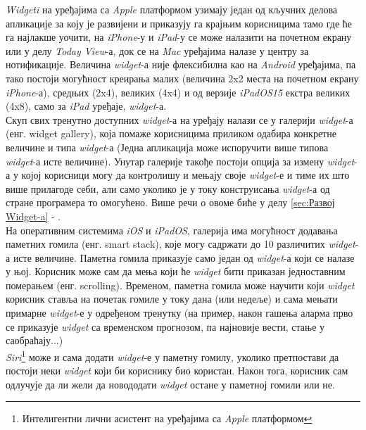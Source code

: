 \documentclass[12pt,oneside]{memoir}
\begin{document}
\indent \textit{Widgeti} на уређајима са \textit{Apple} платформом узимају један од кључних делова апликације за коју је развијени и приказују га крајњим корисницима тамо где ће га најлакше уочити, на \textit{iPhone}-у и \textit{iPad}-у се може налазити на почетном екрану или у делу \textit{Today View}-а, док се на \textit{Mac} уређајима налазе у центру за нотификације. Величина \textit{widget}-а није флексибилна као на \textit{Android} уређајима, па тако постоји могућност креирања малих (величина 2x2 места на почетном екрану \textit{iPhone}-а), средњих (2x4), великих (4x4) и од верзије \textit{iPadOS15} екстра великих (4x8), само за \textit{iPad} уређаје, \textit{widget}-а. 
\\
\indent Скуп свих тренутно доступних \textit{widget}-а на уређају налази се у галерији \textit{widget}-а (енг. widget gallery), која помаже корисницима приликом одабира конкретне величине и типа \textit{widget}-а (Једна апликација може испоручити више типова \textit{widget}-а исте величине). Унутар галерије такође постоји опција за измену \textit{widget}-а у којој корисници могу да контролишу и мењају своје \textit{widget}-е и тиме их што више прилагоде себи, али само уколико је у току конструисања \textit{widget}-а од стране програмера то омогућено. Више речи о овоме биће у делу \ref{sec:Развој Widget-a} - .
\\
\indent На оперативним системима \textit{iOS} и \textit{iPadOS}, галерија има могућност додавања паметних гомила (енг. smart stack), које могу садржати до 10 различитих \textit{widget}-а исте величине. Паметна гомила приказује само један од \textit{widget}-а који се налазе у њој. Корисник може сам да мења који ће \textit{widget} бити приказан једноставним померањем (енг. scrolling). Временом, паметна гомила може научити који \textit{widget} корисник ставља на почетак гомиле у току дана (или недеље) и сама мењати примарне \textit{widget}-е у одређеном тренутку (на пример, након гашења аларма прво се приказује \textit{widget} са временском прогнозом, па најновије вести, стање у саобраћају...)
\\
\indent \textit{Siri}\footnote{Интелигентни лични асистент на уређајима са \textit{Apple} платформом} може и сама додати \textit{widget}-е у паметну гомилу, уколико претпостави да постоји неки \textit{widget} који би кориснику био користан. Након тога, корисник сам одлучује да ли жели да новододати \textit{widget} остане у паметној гомили или не.
\end{document}
